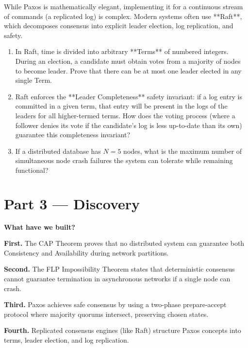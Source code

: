 \documentclass[12pt, a4paper]{book}
\begin{document}
\begin{explobox}
While Paxos is mathematically elegant, implementing it for a continuous stream of commands (a replicated log) is complex.
Modern systems often use **Raft**, which decomposes consensus into explicit leader election, log replication, and safety.
\begin{enumerate}[label=(\alph*), leftmargin=*]
  \item In Raft, time is divided into arbitrary **Terms** of numbered integers.
        During an election, a candidate must obtain votes from a majority of nodes to become leader.
        Prove that there can be at most one leader elected in any single Term.
  \item Raft enforces the **Leader Completeness** safety invariant: if a log entry is committed in a given term, that entry will be present in the logs of the leaders for all higher-termed terms.
        How does the voting process (where a follower denies its vote if the candidate's log is less up-to-date than its own) guarantee this completeness invariant?
  \item If a distributed database has $N = 5$ nodes, what is the maximum number of simultaneous node crash failures the system can tolerate while remaining functional?
\end{enumerate}
\end{explobox}

\newpage

\section{Part 3 --- Discovery}

\begin{discoverybox}
\textbf{What have we built?}

\textbf{First.} The CAP Theorem proves that no distributed system can guarantee both Consistency and Availability during network partitions.

\textbf{Second.} The FLP Impossibility Theorem states that deterministic consensus cannot guarantee termination in asynchronous networks if a single node can crash.

\textbf{Third.} Paxos achieves safe consensus by using a two-phase prepare-accept protocol where majority quorums intersect, preserving chosen states.

\textbf{Fourth.} Replicated consensus engines (like Raft) structure Paxos concepts into terms, leader election, and log replication.
\end{discoverybox}
\end{document}
